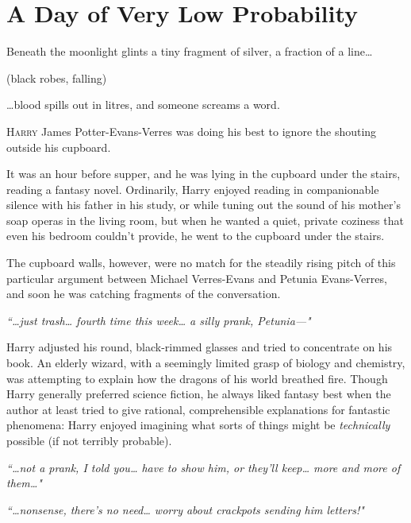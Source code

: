 \chapter{A Day of Very Low Probability}

\begin{chapterOpeningQuote}
\noindent
Beneath the moonlight glints a tiny fragment of silver, a fraction of a line{\ldots}

\vspace*{2ex}
(black robes, falling)

\vspace*{2ex}
{\ldots}blood spills out in litres, and someone screams a word.
\end{chapterOpeningQuote}

\lettrine{H}{arry} James Potter-Evans-Verres was doing his best to ignore the shouting outside his cupboard.

It was an hour before supper, and he was lying in the cupboard under the stairs, reading a fantasy novel. Ordinarily, Harry enjoyed reading in companionable silence with his father in his study, or while tuning out the sound of his mother's soap operas in the living room, but when he wanted a quiet, private coziness that even his bedroom couldn't provide, he went to the cupboard under the stairs.

The cupboard walls, however, were no match for the steadily rising pitch of this particular argument between Michael Verres-Evans and Petunia Evans-Verres, and soon he was catching fragments of the conversation.

\emph{``{\ldots}just trash{\ldots} fourth time this week{\ldots} a silly prank, Petunia---"}

Harry adjusted his round, black-rimmed glasses and tried to concentrate on his book. An elderly wizard, with a seemingly limited grasp of biology and chemistry, was attempting to explain how the dragons of his world breathed fire. Though Harry generally preferred science fiction, he always liked fantasy best when the author at least tried to give rational, comprehensible explanations for fantastic phenomena: Harry enjoyed imagining what sorts of things might be \emph{technically} possible (if not terribly probable).

\emph{``{\ldots}not a prank, I told you{\ldots} have to show him, or they'll keep{\ldots} more and more of them{\ldots}"}

\emph{``{\ldots}nonsense, there's no need{\ldots} worry about crackpots sending him letters!"}

